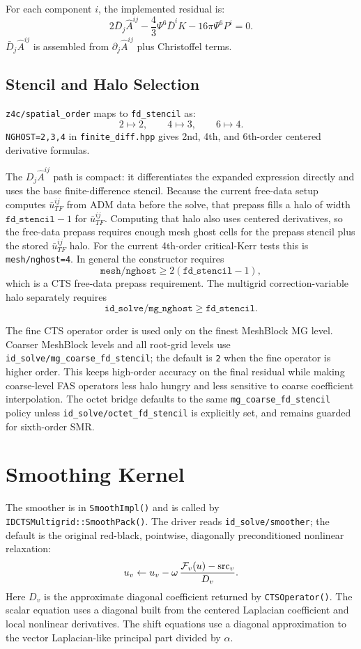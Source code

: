 \documentclass[11pt]{article}
\newcommand{\file}[1]{\nolinkurl{#1}}
\newcommand{\code}[1]{\texttt{#1}}
\begin{document}
For each component \(i\), the implemented residual is:
\[
  2\bar{D}_j\hat{A}^{ij}
  - \frac{4}{3}\Psi^6\bar{D}^iK
  - 16\pi\Psi^6 P^i = 0.
\]
\(\bar{D}_j\hat{A}^{ij}\) is assembled from \(\partial_j\hat{A}^{ij}\) plus
Christoffel terms.

\subsection{Stencil and Halo Selection}

\code{z4c/spatial\_order} maps to \code{fd\_stencil} as:
\[
  2 \mapsto 2,\qquad 4 \mapsto 3,\qquad 6 \mapsto 4.
\]
\code{NGHOST=2,3,4} in \file{finite\_diff.hpp} gives 2nd, 4th, and 6th-order
centered derivative formulas.

The \(D_j\hat{A}^{ij}\) path is compact: it differentiates the expanded
expression directly and uses the base finite-difference stencil.  Because the
current free-data setup computes \(\bar{u}^{ij}_{TF}\) from ADM data before the
solve, that prepass fills a halo of width \(\code{fd\_stencil}-1\) for
\(\bar{u}^{ij}_{TF}\).  Computing that halo also uses centered derivatives, so
the free-data prepass requires enough mesh ghost cells for the prepass stencil
plus the stored \(\bar{u}^{ij}_{TF}\) halo.  For the current 4th-order
critical-Kerr tests this is \code{mesh/nghost=4}.  In general the constructor
requires
\[
  \code{mesh/nghost} \ge 2(\code{fd\_stencil}-1),
\]
which is a CTS free-data prepass requirement.  The multigrid correction-variable
halo separately requires
\[
  \code{id\_solve/mg\_nghost} \ge \code{fd\_stencil}.
\]

The fine CTS operator order is used only on the finest MeshBlock MG level.
Coarser MeshBlock levels and all root-grid levels use
\code{id\_solve/mg\_coarse\_fd\_stencil}; the default is \code{2} when the fine
operator is higher order.  This keeps high-order accuracy on the final residual
while making coarse-level FAS operators less halo hungry and less sensitive to
coarse coefficient interpolation.  The octet bridge defaults to the same
\code{mg\_coarse\_fd\_stencil} policy unless
\code{id\_solve/octet\_fd\_stencil} is explicitly set, and remains guarded for
sixth-order SMR.

\section{Smoothing Kernel}

The smoother is in \code{SmoothImpl()} and is called by
\code{IDCTSMultigrid::SmoothPack()}.  The driver reads
\code{id\_solve/smoother}; the default is the original red-black, pointwise,
diagonally preconditioned nonlinear relaxation:
\[
  u_v \leftarrow u_v - \omega\,
  \frac{\mathcal{F}_v(u)-{\rm src}_v}{D_v}.
\]
Here \(D_v\) is the approximate diagonal coefficient returned by
\code{CTSOperator()}.  The scalar equation uses a diagonal built from the
centered Laplacian coefficient and local nonlinear derivatives.  The shift
equations use a diagonal approximation to the vector Laplacian-like principal
part divided by \(\alpha\).
\end{document}
